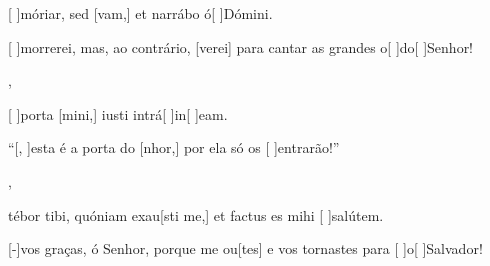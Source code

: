 {  {\item {}[ ]{mó}riar, sed [vam,] et narrábo ó[ ]{Dó}mini.~\Antiphona}%
    {\item {}[ ]{mor}rerei, mas, ao contrário, [verei] para cantar as grandes o[ ]{do}[ ]{Se}nhor!~\Antiphona},
  {\item {}[ ]{por}ta [mini,] iusti intrá[ ]{in}[ ]{e}am.~\Antiphona}%
    {\item {}``[, ]{es}ta é a porta do [nhor,] por ela só os [ ]{en}trarão!''~\Antiphona},
  {\item {}tébor tibi, quóniam exau[sti me,] et factus es mihi [ ]{sa}{lú}tem.~\Antiphona}%
    {\item {}[-]{vos} graças, ó Senhor, porque me ou[tes] e vos tornastes para [ ]{o}[ ]{Sal}vador!~\Antiphona}
}
